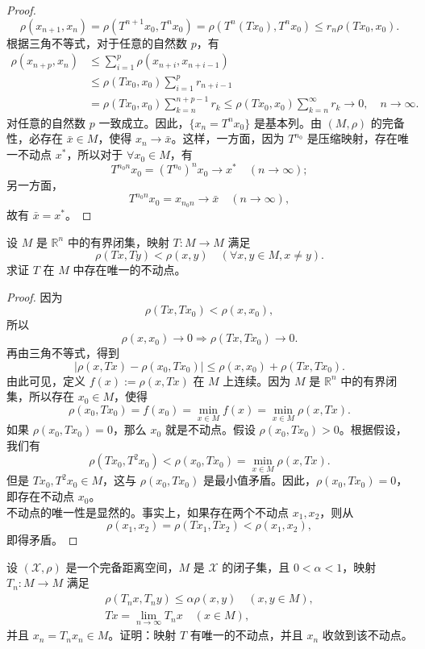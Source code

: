 \documentclass[lang=cn,newtx,10pt,scheme=chinese,thmcnt=chapter]{elegantbook}
\begin{document}
\begin{proof}
\[\rho(x_{n+1}, x_n) = \rho(T^{n+1} x_0, T^n x_0) = \rho(T^n(T x_0), T^n x_0) \leqslant r_n \rho(T x_0, x_0).
\]
根据三角不等式，对于任意的自然数 \( p \)，有
\[
\begin{aligned}
\rho(x_{n+p}, x_n) &\leqslant \sum_{i=1}^p \rho(x_{n+i}, x_{n+i-1}) \\
&\leqslant \rho(T x_0, x_0) \sum_{i=1}^p r_{n+i-1} \\
&= \rho(T x_0, x_0) \sum_{k=n}^{n+p-1} r_k \leqslant \rho(T x_0, x_0) \sum_{k=n}^{\infty} r_k \to 0, \quad n \to \infty.
\end{aligned}
\]
对任意的自然数 \( p \) 一致成立。因此，\( \{ x_n = T^n x_0 \} \) 是基本列。由 \( (M, \rho) \) 的完备性，必存在 \( \bar{x} \in M \)，使得 \( x_n \to \bar{x} \)。这样，一方面，因为 \( T^{n_0} \) 是压缩映射，存在唯一不动点 \( x^* \)，所以对于 \( \forall x_0 \in M \)，有
\[
T^{n_0 n} x_0 = (T^{n_0})^n x_0 \to x^* \quad (n \to \infty);
\]
另一方面，
\[
T^{n_0 n} x_0 = x_{n_0 n} \to \bar{x} \quad (n \to \infty),
\]
故有 \( \bar{x} = x^* \)。
\end{proof}

\begin{example}
设 \( M \) 是 \( \mathbb{R}^n \) 中的有界闭集，映射 \( T: M \to M \) 满足
\[
\rho(T x, T y) < \rho(x, y) \quad (\forall x, y \in M, x \neq y).
\]
求证 \( T \) 在 \( M \) 中存在唯一的不动点。
\end{example}

\begin{proof}
因为
\[
\rho(T x, T x_0) < \rho(x, x_0),
\]
所以
\[
\rho(x, x_0) \to 0 \Longrightarrow \rho(T x, T x_0) \to 0.
\]
再由三角不等式，得到
\[
\left|\rho(x, T x) - \rho(x_0, T x_0)\right| \leqslant \rho(x, x_0) + \rho(T x, T x_0).
\]
由此可见，定义 \( f(x) := \rho(x, T x) \) 在 \( M \) 上连续。因为 \( M \) 是 \( \mathbb{R}^n \) 中的有界闭集，所以存在 \( x_0 \in M \)，使得
\[
\rho(x_0, T x_0) = f(x_0) = \min_{x \in M} f(x) = \min_{x \in M} \rho(x, T x).
\]
如果 \( \rho(x_0, T x_0) = 0 \)，那么 \( x_0 \) 就是不动点。假设 \( \rho(x_0, T x_0) > 0 \)。根据假设，我们有
\[
\rho(T x_0, T^2 x_0) < \rho(x_0, T x_0) = \min_{x \in M} \rho(x, T x).
\]
但是 \( T x_0, T^2 x_0 \in M \)，这与 \( \rho(x_0, T x_0) \) 是最小值矛盾。因此，\( \rho(x_0, T x_0) = 0 \)，即存在不动点 \( x_0 \)。\\
不动点的唯一性是显然的。事实上，如果存在两个不动点 \( x_1, x_2 \)，则从
\[
\rho(x_1, x_2) = \rho(T x_1, T x_2) < \rho(x_1, x_2),
\]
即得矛盾。
\end{proof}
\begin{example}
设 \( (\mathscr{X}, \rho) \) 是一个完备距离空间，\( M \) 是 \( \mathscr{X} \) 的闭子集，且 \( 0 < \alpha < 1 \)，映射 \( T_n: M \to M \) 满足
\[
\begin{gathered}
\rho\left(T_n x, T_n y\right) \leqslant \alpha \rho(x, y) \quad (x, y \in M), \\
T x = \lim_{n \to \infty} T_n x \quad (x \in M),
\end{gathered}
\]
并且 \( x_n = T_n x_n \in M \)。证明：映射 \( T \) 有唯一的不动点，并且 \( x_n \) 收敛到该不动点。
\end{example}
\end{document}

